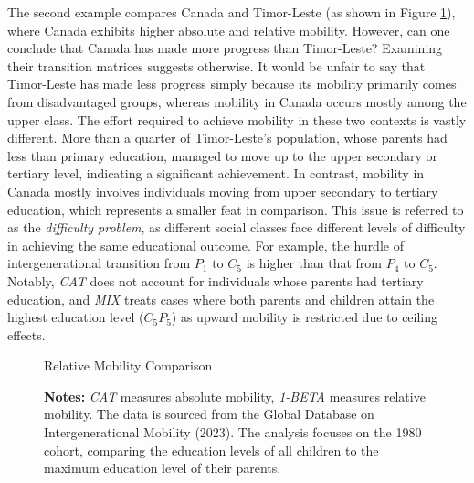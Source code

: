 The second example compares Canada and Timor-Leste (as shown in Figure \ref{fig:compare2}), where Canada exhibits higher absolute and relative mobility. However, can one conclude that Canada has made more progress than Timor-Leste? Examining their transition matrices suggests otherwise. It would be unfair to say that Timor-Leste has made less progress simply because its mobility primarily comes from disadvantaged groups, whereas mobility in Canada occurs mostly among the upper class. The effort required to achieve mobility in these two contexts is vastly different. More than a quarter of Timor-Leste’s population, whose parents had less than primary education, managed to move up to the upper secondary or tertiary level, indicating a significant achievement. In contrast, mobility in Canada mostly involves individuals moving from upper secondary to tertiary education, which represents a smaller feat in comparison. This issue is referred to as the \textit{difficulty problem}, as different social classes face different levels of difficulty in achieving the same educational outcome. For example, the hurdle of intergenerational transition from $P_1$ to $C_5$ is higher than that from $P_4$ to $C_5$. Notably, \textit{CAT} does not account for individuals whose parents had tertiary education, and \textit{MIX} treats cases where both parents and children attain the highest education level ($C_5P_5$) as upward mobility is restricted due to ceiling effects.

\begin{figure}[!ht]
    \centering
    \scalebox{0.55}{}
    \caption{Relative Mobility Comparison}
    \label{fig:compare2}
    \captionsetup{font=footnotesize}
    \caption*{\textbf{Notes:} \textit{CAT} measures absolute mobility, \textit{1-BETA} measures relative mobility. The data is sourced from the Global Database on Intergenerational Mobility (2023). The analysis focuses on the 1980 cohort, comparing the education levels of all children to the maximum education level of their parents.}
\end{figure} 

